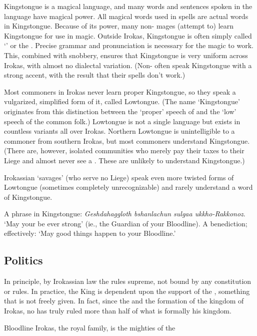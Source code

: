 Kingstongue is a magical language, and many words and sentences spoken in the language have magical power. All magical words used in \draconic{} spells are actual words in Kingstongue. Because of its power, many non-\dragon{} mages (attempt to) learn Kingstongue for use in magic. Outside Irokas, Kingstongue is often simply called `\draconic{}' or the . Precise grammar and pronunciation is necessary for the magic to work. This, combined with \draconic{} snobbery, ensures that Kingstongue is very uniform across Irokas, with almost no dialectal variation. (Non-\dragons{} often speak Kingstongue with a strong accent, with the result that their spells don't work.) 

Most commoners in Irokas never learn proper Kingstongue, so they speak a vulgarized, simplified form of it, called Lowtongue. (The name `Kingstongue' originates from this distinction between the `proper' speech of \dragons{} and the `low' speech of the common folk.) Lowtongue is not a single language but exists in countless variants all over Irokas. Northern Lowtongue is unintelligible to a commoner from southern Irokas, but most commoners understand Kingstongue. (There are, however, isolated communities who merely pay their taxes to their Liege and almost never see a \dragon{}. These are unlikely to understand Kingstongue.) 

Irokassian `savages' (who serve no \draconic{} Liege) speak even more twisted forms of Lowtongue (sometimes completely unrecognizable) and rarely understand a word of Kingstongue. 

A phrase in Kingstongue: \emph{Geshdahaggloth bshanlachun sulgaa ukkho-Rakkonoz}. `May your \daemon{} be ever strong' (ie., the Guardian \Daemon{} of your Bloodline). A benediction; effectively: `May good things happen to your Bloodline.' 



\subsection{Politics}
In principle, by Irokassian law the \DragonKing{} rules supreme, not bound by any constitution or rules. In practice, the King is dependent upon the support of the \Dragonlords{}, something that is not freely given. In fact, since the \banewar{} and the formation of the kingdom of Irokas, no \DragonKing{} has truly ruled more than half of what is formally his kingdom. 

Bloodline Irokas, the royal family, is the mighties of the







